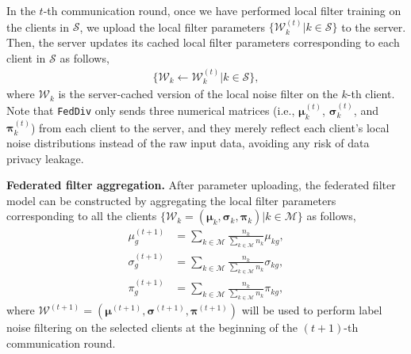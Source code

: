 \documentclass[letterpaper]{article} %
\begin{document}
In the $t$-th communication round, once we have performed local filter training on the clients in $\mathcal{S}$, we upload the local filter parameters $\{\mathcal{W}_{k}^{(t)}|k\in\mathcal{S}\}$ to the server. Then, the server updates its cached local filter parameters corresponding to each client in $\mathcal{S}$ as follows,
\begin{equation}
    \begin{split}
        \{{\mathcal{W}}_{k} \leftarrow {\mathcal{W}}_{k}^{(t)} | k\in\mathcal{S}\},
    \end{split}
\end{equation}
where ${\mathcal{W}}_{k}$ is the server-cached version of the local noise filter on the $k$-th client.
Note that \texttt{FedDiv} only sends three numerical matrices (i.e., $\boldsymbol{\mu}_{k}^{(t)}$, $\boldsymbol{\sigma}_{k}^{(t)}$, and $\boldsymbol{\pi}_{k}^{(t)}$) from each client to the server, and they merely reflect each client's local noise distributions instead of the raw input data, avoiding any risk of data privacy leakage.

\noindent
\textbf{Federated filter aggregation.}
After parameter uploading, the federated filter model can be constructed by aggregating the local filter parameters corresponding to all the clients $\{\mathcal{W}_{k}=(\bm{\mu}_{k}, \bm{\sigma}_{k}, \bm{{\pi}}_{k})|k\in\mathcal{M}\}$  as follows,
\begin{equation}
    \label{Equation:M-Step-at-Server}
    \begin{split}
        {{{\mu}}^{(t+1)}_{g}} &= \sum_{k\in \mathcal{M}} \frac{n_k}{\sum_{k\in \mathcal{M}} n_k}  {{\mu}}_{kg}, \\
        {{\sigma}^{(t+1)}_{g}} &= \sum_{k\in \mathcal{M}} \frac{n_k}{\sum_{k\in \mathcal{M}} n_k} {{\sigma}}_{kg}, \\
        {{{\pi}}^{(t+1)}_{g}} &= \sum_{k\in \mathcal{M}} \frac{n_k}{\sum_{k\in \mathcal{M}} n_k} {{\pi}}_{kg},
    \end{split}
\end{equation}
where $\mathcal{W}^{(t+1)}=(\bm{\mu}^{(t+1)}, \bm{\sigma}^{(t+1)}, \bm{{\pi}}^{(t+1)})$ will be used to perform label noise filtering on the selected clients at the beginning of the $(t+1)$-th communication round.
\end{document}
